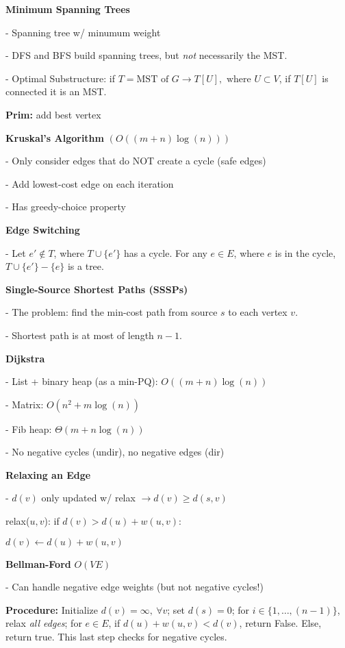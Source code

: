 \documentclass[letterpaper]{article}
\begin{document}
\begin{minipage}[t]{0.45\textwidth}

\textbf{Minimum Spanning Trees}

- Spanning tree w/ minumum weight

- DFS and BFS build spanning trees, but \emph{not} necessarily the MST.

- Optimal Substructure: if $T = \text{MST of } G \rightarrow T[U], \text{ where } U \subset V$, if $T[U]$ is connected it is an MST.

\textbf{Prim: } add best vertex

\textbf{Kruskal's Algorithm} $(O((m + n)\log(n)))$

- Only consider edges that do NOT create a cycle (safe edges)

- Add lowest-cost edge on each iteration

- Has greedy-choice property

\textbf{Edge Switching}

- Let $e' \notin T$, where $T \cup \{e'\}$ has a cycle. For any $e \in E$, where $e$ is in the cycle, $T \cup \{e'\} - \{e\}$ is a tree.

\textbf{Single-Source Shortest Paths (SSSPs)}

- The problem: find the min-cost path from source $s$ to each vertex $v$.

- Shortest path is at most of length $n-1$.

\textbf{Dijkstra}

- List + binary heap (as a min-PQ): $O((m+n)\log(n))$

- Matrix: $O(n^2 + m\log(n))$

- Fib heap: $\Theta(m + n\log(n))$

- No negative cycles (undir), no negative edges (dir)

\textbf{Relaxing an Edge}

- $d(v)$ only updated w/ relax $\rightarrow d(v) \geq d(s, v)$

relax($u, v$): if $d(v) > d(u) + w(u, v)$:

\hspace{0.5cm} $d(v) \leftarrow d(u) + w(u, v)$

\textbf{Bellman-Ford} $O(VE)$

- Can handle negative edge weights (but not negative cycles!)

{\small \textbf{Procedure:}
Initialize $d(v) = \infty,\ \forall v$; set $d(s) = 0$; for $i \in \{1, \ldots, (n-1)\}$, relax \emph{all edges}; for $e \in E$, if $d(u) + w(u, v) < d(v)$, return False. Else, return true. This last step checks for negative cycles.}


\end{minipage}
\end{document}
